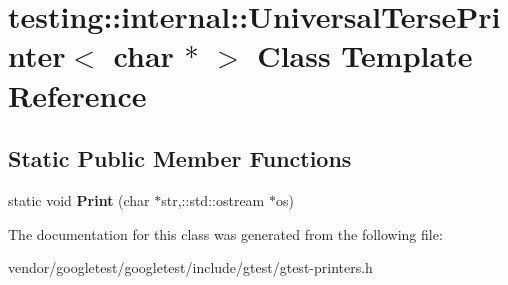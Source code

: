 \hypertarget{classtesting_1_1internal_1_1UniversalTersePrinter_3_01char_01_5_01_4}{}\section{testing\+:\+:internal\+:\+:Universal\+Terse\+Printer$<$ char $\ast$ $>$ Class Template Reference}
\label{classtesting_1_1internal_1_1UniversalTersePrinter_3_01char_01_5_01_4}
\subsection*{Static Public Member Functions}
\begin{DoxyCompactItemize}
\item 
static void {\bfseries Print} (char $\ast$str,\+::std\+::ostream $\ast$os)\hypertarget{classtesting_1_1internal_1_1UniversalTersePrinter_3_01char_01_5_01_4_a88c426f4af279251b4f4a02cd55ab57c}{}\label{classtesting_1_1internal_1_1UniversalTersePrinter_3_01char_01_5_01_4_a88c426f4af279251b4f4a02cd55ab57c}

\end{DoxyCompactItemize}


The documentation for this class was generated from the following file\+:\begin{DoxyCompactItemize}
\item 
vendor/googletest/googletest/include/gtest/gtest-\/printers.\+h\end{DoxyCompactItemize}
